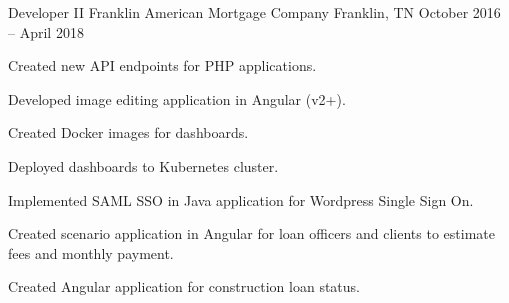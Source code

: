 \documentclass[letterpaper]{awesome-cv}
\begin{document}
\begin{cventries}
  \cventry
    {Developer II}
    {Franklin American Mortgage Company}
    {Franklin, TN}
    {October 2016 – April 2018}
    {\begin{cvitems}
      \item {Created new API endpoints for PHP applications.}
      \item {Developed image editing application in Angular (v2+).}
      \item {Created Docker images for dashboards.}
      \item {Deployed dashboards to Kubernetes cluster.}
      \item {Implemented SAML SSO in Java application for Wordpress Single Sign On.}
      \item {Created scenario application in Angular for loan officers and clients to estimate fees and monthly payment.}
      \item {Created Angular application for construction loan status.}
      \end{cvitems}}


\end{cventries}
\end{document}
